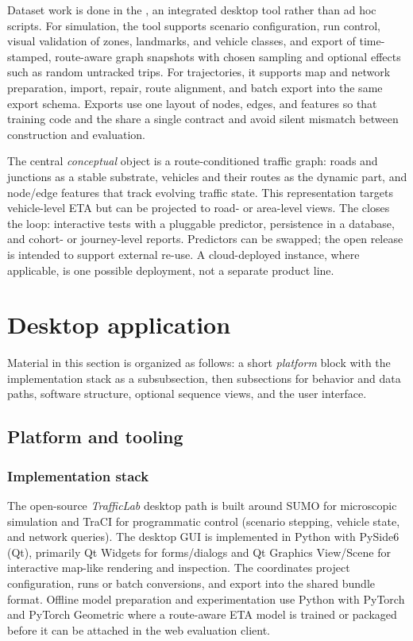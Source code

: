

Dataset work is done in the \DesktopTool{}, an integrated desktop tool rather than ad hoc scripts. For simulation, the tool supports scenario configuration, run control, visual validation of zones, landmarks, and vehicle classes, and export of time-stamped, route-aware graph snapshots with chosen sampling and optional effects such as random untracked trips. For trajectories, it supports map and network preparation, import, repair, route alignment, and batch export into the same export schema. Exports use one layout of nodes, edges, and features so that training code and the \WebApp{} share a single contract and avoid silent mismatch between construction and evaluation.

The central \emph{conceptual} object is a route-conditioned traffic graph: roads and junctions as a stable substrate, vehicles and their routes as the dynamic part, and node/edge features that track evolving traffic state. This representation targets vehicle-level ETA but can be projected to road- or area-level views. The \WebApp{} closes the loop: interactive tests with a pluggable predictor, persistence in a database, and cohort- or journey-level reports. Predictors can be swapped; the open release is intended to support external re-use. A cloud-deployed instance, where applicable, is one possible deployment, not a separate product line.

\section{Desktop application}\label{sec:system:desktop}
Material in this section is organized as follows: a short \emph{platform} block with the implementation stack as a subsubsection, then subsections for behavior and data paths, software structure, optional sequence views, and the user interface.

\subsection{Platform and tooling}\label{sec:system:desktop:platform}
\subsubsection{Implementation stack}\label{sec:system:desktop:stack}
The open-source \emph{TrafficLab} desktop path is built around SUMO for microscopic simulation and TraCI for programmatic control (scenario stepping, vehicle state, and network queries). The desktop GUI is implemented in Python with PySide6 (Qt), primarily Qt Widgets for forms/dialogs and Qt Graphics View/Scene for interactive map-like rendering and inspection. The \DesktopTool{} coordinates project configuration, runs or batch conversions, and export into the shared bundle format. Offline model preparation and experimentation use Python with PyTorch and PyTorch Geometric where a route-aware ETA model is trained or packaged before it can be attached in the web evaluation client.

